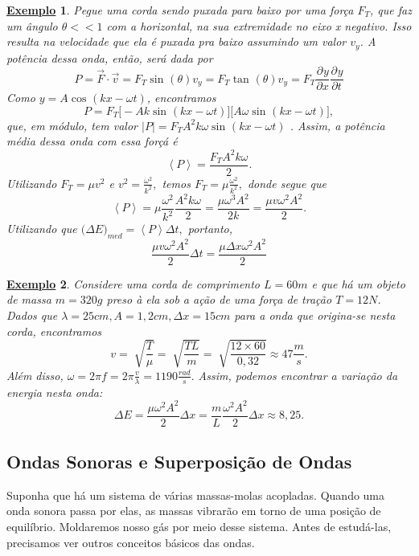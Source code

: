\documentclass{article}
\newtheorem{example}{\underline{Exemplo}}
\begin{document}
\begin{example}
  Pegue uma corda sendo puxada para baixo por uma força \(F_{T}\), que faz um ângulo \(\theta << 1\) com a horizontal, na sua extremidade no eixo x negativo. Isso resulta
  na velocidade que ela é puxada pra baixo assumindo um valor \(v_{y}\). A potência dessa onda, então, será dada por 
  \[
    P = \vec{F}\cdot \vec{v} = F_{T}\sin^{}{(\theta )}v_{y} = F_{T}\tan^{}{(\theta )}v_{y} = F_{T}\frac{\partial^{}y}{\partial x^{}}\frac{\partial^{}y}{\partial t^{}}
  \]
  Como \(y = A\cos^{}{(kx - \omega t)}\), encontramos 
  \[
    P = F_{T}\biggl[-Ak\sin^{}{(kx - \omega t)}\biggr]\biggl[A\omega \sin^{}{(kx - \omega t)}\biggr],
  \]
  que, em módulo, tem valor \(|P|=F_{T}A^{2}k\omega \sin^{}{(kx-\omega t)}\) . Assim, a potência média dessa onda com essa forçá é 
  \[
    \left< P \right> = \frac{F_{T}A^{2}k\omega }{2}.
  \]
  Utilizando \(F_{T} = \mu v^{2}\) e \(v^{2} = \frac{\omega ^{2}}{k^{2}},\) temos \(F_{T} = \mu \frac{\omega^{2}}{k^{2}},\) donde segue que
  \[
    \left< P \right> = \mu \frac{\omega^{2}}{k^{2}}\frac{A^{2}k\omega }{2} = \frac{\mu\omega^{3}A^{2}}{2k} = \frac{\mu v \omega^{2}A^{2}}{2}.
  \]
  Utilizando que \(\biggl(\Delta E\biggr)_{med} = \left< P \right> \Delta t,\) portanto, 
  \[
    \frac{\mu v \omega ^{2}A^{2}}{2}\Delta t = \frac{\mu\Delta x\omega^{2}A^{2}}{2}
  \]
\end{example}
\begin{example}
  Considere uma corda de comprimento \(L = 60m\) e que há um objeto de massa \(m =320g\) preso à ela sob a ação de uma força de tração
  \(T = 12N\). Dados que \(\lambda = 25cm, A = 1,2cm, \Delta x = 15cm\) para a onda que origina-se nesta corda, encontramos 
  \[
    v = \sqrt[]{\frac{T}{\mu}} = \sqrt[]{\frac{TL}{m}} = \sqrt[]{\frac{12\times 60}{0,32}}\approx 47\frac{m}{s}.
  \]
  Além disso, \(\omega = 2\pi f = 2\pi \frac{v}{\lambda } = 1190\frac{rad}{s}.\) Assim, podemos encontrar a variação da energia nesta onda: 
  \[
    \Delta E = \frac{\mu\omega ^{2}A^{2}}{2}\Delta x = \frac{m}{L}\frac{\omega ^{2}A^{2}}{2}\Delta x\approx 8,25. 
  \]
\end{example}
\subsection{Ondas Sonoras e Superposição de Ondas}
Suponha que há um sistema de várias massas-molas acopladas. Quando uma onda sonora passa por elas, as massas vibrarão em torno de uma posição de equilíbrio.
Moldaremos nosso gás por meio desse sistema. Antes de estudá-las, precisamos ver outros conceitos básicos das ondas.
\end{document}
